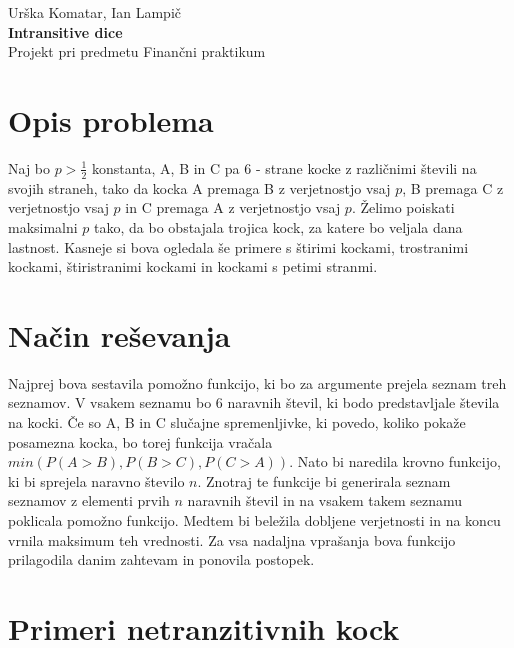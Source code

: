 \documentclass[12pt,a4paper]{amsart}
\begin{document}
    
\thispagestyle{empty}
\vfill

\begin{center}{\large
Urška Komatar, Ian Lampič\\[2mm]
{\Huge \bf Intransitive dice}\\[5mm]
Projekt pri predmetu Finančni praktikum\\[1cm]}
\end{center}
\vfill

\pagebreak

\section{Opis problema}
Naj bo $p > \frac{1}{2}$ konstanta, A, B in C pa 6 - strane kocke z različnimi števili na svojih straneh, tako da kocka A premaga
B z verjetnostjo vsaj $p$, B premaga C z verjetnostjo vsaj $p$ in C premaga A z verjetnostjo vsaj $p$. Želimo poiskati maksimalni $p$ tako, 
da bo obstajala trojica kock, za katere bo veljala dana lastnost. Kasneje si bova ogledala še primere s štirimi kockami, trostranimi kockami, štiristranimi kockami
in kockami s petimi stranmi.

\section{Način reševanja}
Najprej bova sestavila pomožno funkcijo, ki bo za argumente prejela seznam treh seznamov. V vsakem seznamu bo 6 naravnih števil, ki bodo predstavljale števila na kocki. Če so A, B in C slučajne spremenljivke, ki povedo, koliko pokaže posamezna kocka, bo torej funkcija vračala $min(P(A>B), P(B>C), P(C>A))$. Nato bi naredila krovno funkcijo, ki bi sprejela
naravno število $n$. Znotraj te funkcije bi generirala seznam seznamov z elementi prvih $n$ naravnih števil in na vsakem takem seznamu poklicala pomožno funkcijo.
Medtem bi beležila dobljene verjetnosti in na koncu vrnila maksimum teh vrednosti. Za vsa nadaljna vprašanja bova funkcijo prilagodila danim zahtevam in ponovila postopek.

\section{Primeri netranzitivnih kock}
\end{document}
